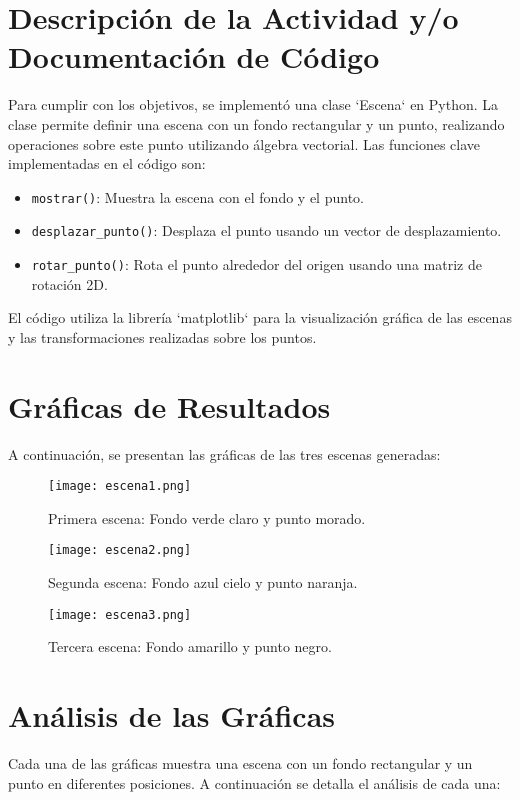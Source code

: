 \documentclass{article}
\begin{document}
\section{Descripción de la Actividad y/o Documentación de Código}
Para cumplir con los objetivos, se implementó una clase `Escena` en Python. La clase permite definir una escena con un fondo rectangular y un punto, realizando operaciones sobre este punto utilizando álgebra vectorial. Las funciones clave implementadas en el código son:
\begin{itemize}
    \item \texttt{mostrar()}: Muestra la escena con el fondo y el punto.
    \item \texttt{desplazar\_punto()}: Desplaza el punto usando un vector de desplazamiento.
    \item \texttt{rotar\_punto()}: Rota el punto alrededor del origen usando una matriz de rotación 2D.
\end{itemize}

El código utiliza la librería `matplotlib` para la visualización gráfica de las escenas y las transformaciones realizadas sobre los puntos.

\section{Gráficas de Resultados}
A continuación, se presentan las gráficas de las tres escenas generadas:

\begin{figure}[h!]
    \centering
    \texttt{[image: escena1.png]}
    \caption{Primera escena: Fondo verde claro y punto morado.}
    \label{fig:escena1}
\end{figure}

\begin{figure}[h!]
    \centering
    \texttt{[image: escena2.png]}
    \caption{Segunda escena: Fondo azul cielo y punto naranja.}
    \label{fig:escena2}
\end{figure}

\begin{figure}[h!]
    \centering
    \texttt{[image: escena3.png]}
    \caption{Tercera escena: Fondo amarillo y punto negro.}
    \label{fig:escena3}
\end{figure}

\section{Análisis de las Gráficas}
Cada una de las gráficas muestra una escena con un fondo rectangular y un punto en diferentes posiciones. A continuación se detalla el análisis de cada una:
\end{document}

